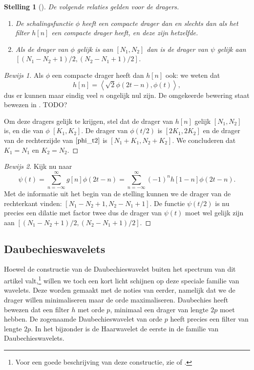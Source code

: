 \documentclass[11pt]{uvamath}
\theoremstyle{plain}
\newtheorem{stelling}{Stelling}[chapter]
\theoremstyle{definition}
\theoremstyle{remark}
\begin{document}
\begin{stelling}[{\cite[P7.2]{mallat}}]
  De volgende relaties gelden voor de dragers.
  \begin{enumerate}
  \item De schalingsfunctie $\phi$ heeft een compacte drager dan en slechts dan als het filter $h[n]$ een compacte drager heeft, en deze zijn hetzelfde.
  \item Als de drager van $\phi$ gelijk is aan $[N_1,N_2]$ dan is de drager van $\psi$ gelijk aan $[(N_1 - N_2 + 1)/2, (N_2 - N_1 + 1)/2]$.
  \end{enumerate}
\end{stelling}
\begin{proof}[Bewijs 1] Als $\phi$ een compacte drager heeft dan $h[n]$ ook: we weten dat
  \[
  h[n] = \left\langle \sqrt{2} \phi\left(2t-n\right), \phi(t) \right\rangle,
  \]
  dus er kunnen maar eindig veel $n$ ongelijk nul zijn. De omgekeerde bewering staat bewezen in \cite{daubechies[P965-967]}. TODO?

  Om deze dragers gelijk te krijgen, stel dat de drager van $h[n]$ gelijk $[N_1,N_2]$ is, en die van $\phi$ $[K_1, K_2]$. De drager van $\phi(t/2)$ is $[2K_1, 2K_2]$ en de drager van de rechterzijde van $\ref{phi_t2}$ is $[N_1 + K_1, N_2 + K_2]$. We concluderen dat $K_1 = N_1$ en $K_2 = N_2$.
\end{proof}
\begin{proof}[Bewijs 2]
  Kijk nu naar
  \[
  \psi\left(t\right) = \sum_{n=-\infty}^{\infty} g[n] \phi(2t-n) = \sum_{n=-\infty}^{\infty} (-1)^{n}h[1-n] \phi(2t-n).
  \]
  Met de informatie uit het begin van de stelling kunnen we de drager van de rechterkant vinden: $[N_1 - N_2 + 1, N_2 - N_1 + 1]$. De functie $\psi(t/2)$ is nu precies een dilatie met factor twee dus de drager van $\psi(t)$ moet wel gelijk zijn aan $[(N_1 - N_2 + 1)/2, (N_2 - N_1 + 1)/2]$.
\end{proof}

\subsection{Daubechieswavelets}
Hoewel de constructie van de Daubechieswavelet buiten het spectrum van dit artikel valt,\footnote{Voor een goede beschrijving van deze constructie, zie \cite{mallat} of \cite{daubechies}.} willen we toch een kort licht schijnen op deze speciale familie van wavelets. Deze worden gemaakt met de noties van eerder, namelijk dat we de drager willen minimaliseren maar de orde maximaliseren. Daubechies heeft bewezen\cite{daubechies} dat een filter $h$ met orde $p$, minimaal een drager van lengte $2p$ moet hebben. De zogenaamde Daubechieswavelet van orde $p$ heeft precies een filter van lengte $2p$. In het bijzonder is de Haarwavelet de eerste in de familie van Daubechieswavelets.
\end{document}

